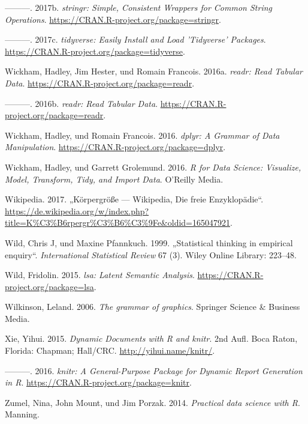 \documentclass[12pt,ngerman,]{book}
\begin{document}
\hypertarget{ref-R-stringr}{}
---------. 2017b. \emph{stringr: Simple, Consistent Wrappers for Common
String Operations}. \url{https://CRAN.R-project.org/package=stringr}.

\hypertarget{ref-R-tidyverse}{}
---------. 2017c. \emph{tidyverse: Easily Install and Load 'Tidyverse'
Packages}. \url{https://CRAN.R-project.org/package=tidyverse}.

\hypertarget{ref-R-readr}{}
Wickham, Hadley, Jim Hester, und Romain Francois. 2016a. \emph{readr:
Read Tabular Data}. \url{https://CRAN.R-project.org/package=readr}.

\hypertarget{ref-readr}{}
---------. 2016b. \emph{readr: Read Tabular Data}.
\url{https://CRAN.R-project.org/package=readr}.

\hypertarget{ref-R-dplyr}{}
Wickham, Hadley, und Romain Francois. 2016. \emph{dplyr: A Grammar of
Data Manipulation}. \url{https://CRAN.R-project.org/package=dplyr}.

\hypertarget{ref-r4ds}{}
Wickham, Hadley, und Garrett Grolemund. 2016. \emph{R for Data Science:
Visualize, Model, Transform, Tidy, and Import Data}. O'Reilly Media.

\hypertarget{ref-wiki:groesse}{}
Wikipedia. 2017. „Körpergröße --- Wikipedia, Die freie Enzyklopädie``.
\url{https://de.wikipedia.org/w/index.php?title=K\%C3\%B6rpergr\%C3\%B6\%C3\%9Fe\&oldid=165047921}.

\hypertarget{ref-wild1999statistical}{}
Wild, Chris J, und Maxine Pfannkuch. 1999. „Statistical thinking in
empirical enquiry``. \emph{International Statistical Review} 67 (3).
Wiley Online Library: 223--48.

\hypertarget{ref-R-lsa}{}
Wild, Fridolin. 2015. \emph{lsa: Latent Semantic Analysis}.
\url{https://CRAN.R-project.org/package=lsa}.

\hypertarget{ref-wilkinson2006grammar}{}
Wilkinson, Leland. 2006. \emph{The grammar of graphics}. Springer
Science \& Business Media.

\hypertarget{ref-xie2015}{}
Xie, Yihui. 2015. \emph{Dynamic Documents with R and knitr}. 2nd Aufl.
Boca Raton, Florida: Chapman; Hall/CRC. \url{http://yihui.name/knitr/}.

\hypertarget{ref-R-knitr}{}
---------. 2016. \emph{knitr: A General-Purpose Package for Dynamic
Report Generation in R}. \url{https://CRAN.R-project.org/package=knitr}.

\hypertarget{ref-zumel2014practical}{}
Zumel, Nina, John Mount, und Jim Porzak. 2014. \emph{Practical data
science with R}. Manning.

\printindex

\backmatter
\end{document}
